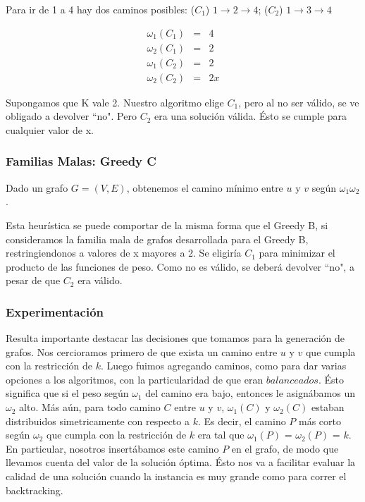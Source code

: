 Para ir de 1 a 4 hay dos caminos posibles: ($C_1$) $1 \rightarrow 2 \rightarrow 4$; ($C_2$) $1 \rightarrow 3 \rightarrow 4$

\begin{eqnarray}
 \omega_1(C_1) &=& 4 	\\ 
 \omega_2(C_1) &=& 2	\\
 \omega_1(C_2) &=& 2	\\
 \omega_2(C_2) &=& 2x
\end{eqnarray}

Supongamos que K vale 2. Nuestro algoritmo elige $C_1$, pero al no ser válido, se ve obligado a devolver ``no". Pero $C_2$ era una solución
válida. Ésto se cumple para cualquier valor de x.

\clearpage
\subsubsection{Familias Malas: Greedy C}\label{subsubsec:greedy-c}
Dado un grafo $G = (V,E)$, obtenemos el camino m\'inimo entre $u$ y $v$ seg\'un $\omega_1\omega_2$. 

Esta heurística se puede comportar de la misma forma que el Greedy B, si consideramos la familia mala de grafos desarrollada para el Greedy B,
restringiendonos a valores de x mayores a 2. Se eligiría $C_1$  para minimizar el producto de las funciones de peso. Como no es válido,
se deberá devolver ``no", a pesar de que $C_2$ era válido. 

\subsubsection{Experimentación}
Resulta importante destacar las decisiones que tomamos para la generación de grafos. Nos cercioramos primero de que exista un camino entre $u$ y
$v$ que cumpla con la restricción de $k$. Luego fuimos agregando caminos, como para dar varias opciones a los algoritmos, con la particularidad
de que eran $balanceados$. Ésto significa que si el peso según $\omega_1$ del camino era bajo, entonces le asignábamos un $\omega_2$ alto.
Más aún, para todo camino $C$ entre $u$ y $v$, $\omega_1(C)$ y $\omega_2(C)$ estaban distribuidos simetricamente con respecto a $k$.
Es decir, el camino $P$ más corto según $\omega_2$ que cumpla con la restricción de $k$ era tal que $\omega_1(P)$ = $\omega_2(P)$ = $k$.
En particular, nosotros insertábamos este camino $P$ en el grafo, de modo que llevamos cuenta del valor de la solución óptima. Ésto nos va a
facilitar evaluar la calidad de una solución cuando la instancia es muy grande como para correr el backtracking.


